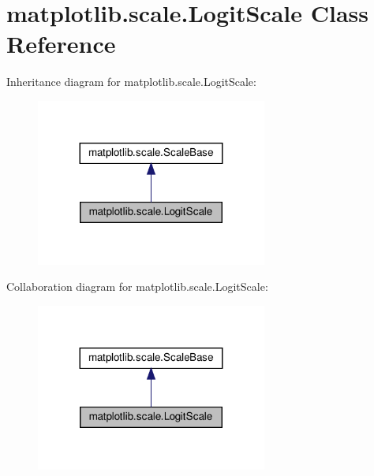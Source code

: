 \hypertarget{classmatplotlib_1_1scale_1_1LogitScale}{}\section{matplotlib.\+scale.\+Logit\+Scale Class Reference}
\label{classmatplotlib_1_1scale_1_1LogitScale}


Inheritance diagram for matplotlib.\+scale.\+Logit\+Scale\+:
\nopagebreak
\begin{figure}[H]
\begin{center}
\leavevmode
\includegraphics[width=215pt]{classmatplotlib_1_1scale_1_1LogitScale__inherit__graph}
\end{center}
\end{figure}


Collaboration diagram for matplotlib.\+scale.\+Logit\+Scale\+:
\nopagebreak
\begin{figure}[H]
\begin{center}
\leavevmode
\includegraphics[width=215pt]{classmatplotlib_1_1scale_1_1LogitScale__coll__graph}
\end{center}
\end{figure}
